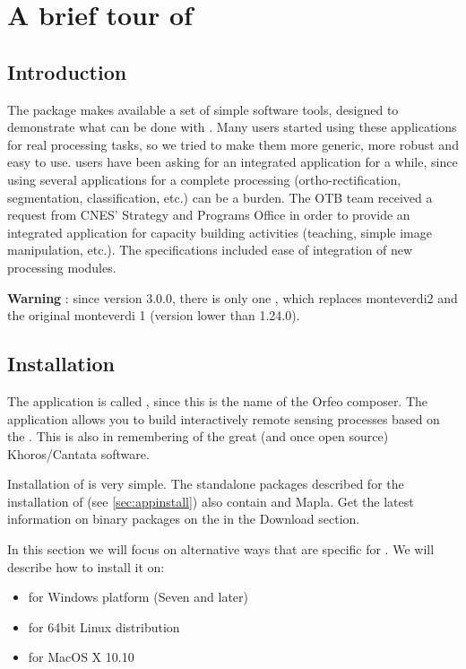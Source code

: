 \chapter{A brief tour of \mont}\label{chap:Monteverdi} 

\section{Introduction}\label{sec:montintro}
The \app package makes available a set of simple software
tools, designed to demonstrate what can be done with
\otb. Many users started using these applications for real processing
tasks, so we tried to make them more generic, more robust and easy to
use. \otb users have been asking for an integrated application for a
while, since using several applications for a complete processing
(ortho-rectification, segmentation, classification, etc.) can be a
burden. The OTB team received a request from CNES' Strategy
and Programs Office in order to provide an integrated application for
capacity building activities (teaching, simple image manipulation,
etc.). The specifications included ease of integration of new
processing modules.  

\textbf{Warning} : since version 3.0.0, there is only one \mont, which replaces
monteverdi2 and the original monteverdi 1 (version lower than 1.24.0).

\section{Installation}\label{sec:montinstall}

The application is called \mont, since this is the name of the Orfeo
composer. The application allows you to build interactively remote
sensing processes based on the \otb. This is also in
remembering of the great (and once open source) Khoros/Cantata
software.
  
Installation of \mont is very simple. The standalone packages described for the
installation of \app (see \ref{sec:appinstall}) also contain \mont and Mapla.
Get the latest information on binary packages on the \website in the Download section.


In this section we will focus on alternative ways that are specific for \mont.
We will describe how to install it on:
\begin{itemize}
\item for Windows platform (Seven and later)
\item for 64bit Linux distribution
\item for MacOS X 10.10
\end{itemize}

